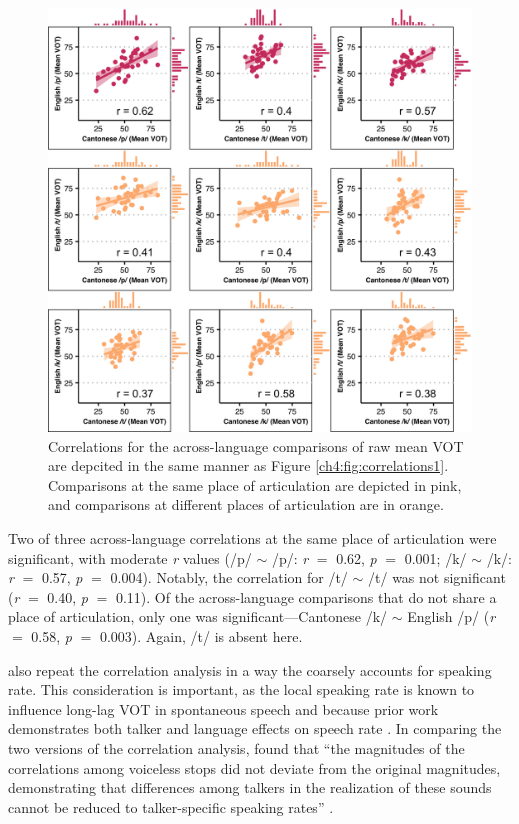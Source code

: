 \begin{figure}[htbp]
  \begin{center}
  \includegraphics[width=0.9\linewidth]{figures/ch4_correlations2_5in.png} 
  \caption{Correlations for the across-language comparisons of raw mean VOT are depcited in the same manner as Figure \ref{ch4:fig:correlations1}. Comparisons at the same place of articulation are depicted in pink, and comparisons at different places of articulation are in orange.} 
  \label{ch4:fig:correlations2}
  \end{center}
\end{figure}

Two of three across-language correlations at the same place of articulation were significant, with moderate \textit{r} values (/p/ $\sim$ /p/: \textit{r} $=$ 0.62, \textit{p} $=$ 0.001; /k/ $\sim$ /k/: \textit{r} $=$ 0.57, \textit{p} $=$ 0.004). Notably, the correlation for /t/ $\sim$ /t/ was not significant (\textit{r} $=$ 0.40, \textit{p} $=$ 0.11). Of the across-language comparisons that do not share a place of articulation, only one was significant---Cantonese /k/ $\sim$ English /p/ (\textit{r} $=$ 0.58, \textit{p} $=$ 0.003). Again, /t/ is absent here.

\citet{chodroff_2017_structure} also repeat the correlation analysis in a way the coarsely accounts for speaking rate. This consideration is important, as the local speaking rate is known to influence long-lag VOT in spontaneous speech \citep{stuartsmith_2015_private} and because prior work demonstrates both talker and language effects on speech rate \citep{bradlow_2017_rate}. In comparing the two versions of the correlation analysis, \citeauthor{chodroff_2017_structure} found that ``the magnitudes of the correlations among voiceless stops did not deviate from the original magnitudes, demonstrating that differences among talkers in the realization of these sounds cannot be reduced to talker-specific speaking rates'' \citeyearpar[][p. 34]{chodroff_2017_structure}. 

